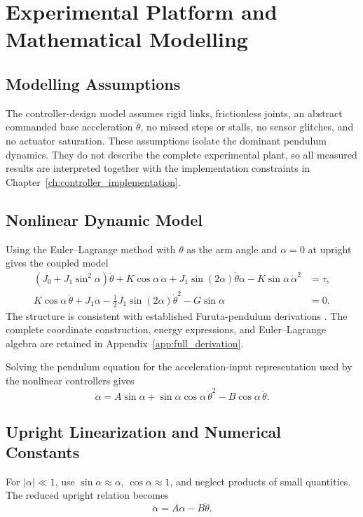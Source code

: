 \chapter{Experimental Platform and Mathematical Modelling}
\label{ch:platform_modelling}
\label{ch:modelling}




\section{Modelling Assumptions}
The controller-design model assumes rigid links, frictionless joints, an
abstract commanded base acceleration $\ddot{\theta}$, no missed steps or
stalls, no sensor glitches, and no actuator saturation. These assumptions
isolate the dominant pendulum dynamics. They do not describe the complete
experimental plant, so all measured results are interpreted together with the
implementation constraints in Chapter~\ref{ch:controller_implementation}.

\section{Nonlinear Dynamic Model}
Using the Euler--Lagrange method with $\theta$ as the arm angle and $\alpha=0$
at upright gives the coupled model
\begin{align}
(J_0+J_1\sin^2\alpha)\ddot{\theta}
{}+K\cos\alpha\,\ddot{\alpha}
{}+J_1\sin(2\alpha)\dot{\theta}\dot{\alpha}
-K\sin\alpha\,\dot{\alpha}^2 &= \tau, \\
K\cos\alpha\,\ddot{\theta}
{}+J_1\ddot{\alpha}
-\frac{1}{2}J_1\sin(2\alpha)\dot{\theta}^2
-G\sin\alpha &= 0.
\end{align}
The structure is consistent with established Furuta-pendulum derivations
\cite{Cazzolato2011}. The complete coordinate construction, energy
expressions, and Euler--Lagrange algebra are retained in
Appendix~\ref{app:full_derivation}.

Solving the pendulum equation for the acceleration-input representation used
by the nonlinear controllers gives
\begin{equation}
\ddot{\alpha}
=A\sin\alpha
+\sin\alpha\cos\alpha\,\dot{\theta}^{2}
-B\cos\alpha\,\ddot{\theta}.
\label{eq:nonlinear_reduced}
\end{equation}

\section{Upright Linearization and Numerical Constants}
For $|\alpha|\ll 1$, use $\sin\alpha\approx\alpha$,
$\cos\alpha\approx1$, and neglect products of small quantities. The reduced
upright relation becomes
\begin{equation}
\ddot{\alpha}=A\alpha-B\ddot{\theta}.
\label{eq:upright_reduced}
\end{equation}

